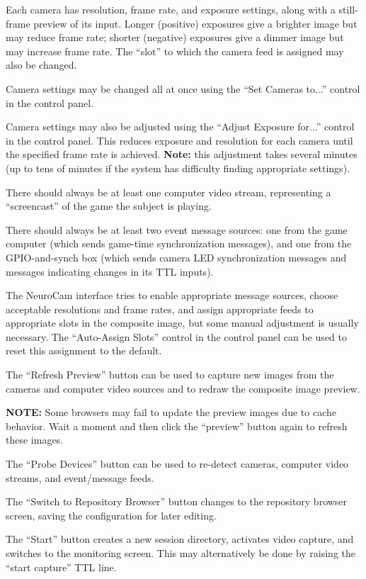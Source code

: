 Each camera has resolution, frame rate, and exposure settings, along with a
still-frame preview of its input. Longer (positive) exposures give a brighter
image but may reduce frame rate; shorter (negative) exposures give a dimmer
image but may increase frame rate. The ``slot'' to which the camera feed is
assigned may also be changed.

Camera settings may be changed all at once using the ``Set Cameras to...''
control in the control panel.

Camera settings may also be adjusted using the ``Adjust Exposure for...''
control in the control panel. This reduces exposure and resolution for each
camera until the specified frame rate is achieved. \textbf{Note:} this
adjustment takes several minutes (up to tens of minutes if the system has
difficulty finding appropriate settings).

There should always be at least one computer video stream, representing
a ``screencast'' of the game the subject is playing.

There should always be at least two event message sources: one from the game
computer (which sends game-time synchronization messages), and one from the
GPIO-and-synch box (which sends camera LED synchronization messages and
messages indicating changes in its TTL inputs).

The NeuroCam interface tries to enable appropriate message sources, choose
acceptable resolutions and frame rates, and assign appropriate feeds to
appropriate slots in the composite image, but some manual adjustment is
usually necessary. The ``Auto-Assign Slots'' control in the control panel
can be used to reset this assignment to the default.

The ``Refresh Preview'' button can be used to capture new images from the
cameras and computer video sources and to redraw the composite image preview.

\textbf{NOTE:} Some browsers may fail to update the preview images due to
cache behavior. Wait a moment and then click the ``preview'' button again
to refresh these images.

The ``Probe Devices'' button can be used to re-detect cameras, computer video
streams, and event/message feeds.

The ``Switch to Repository Browser'' button changes to the repository browser
screen, saving the configuration for later editing.

The ``Start'' button creates a new session directory, activates video capture,
and switches to the monitoring screen. This may alternatively be done by
raising the ``start capture'' TTL line.

